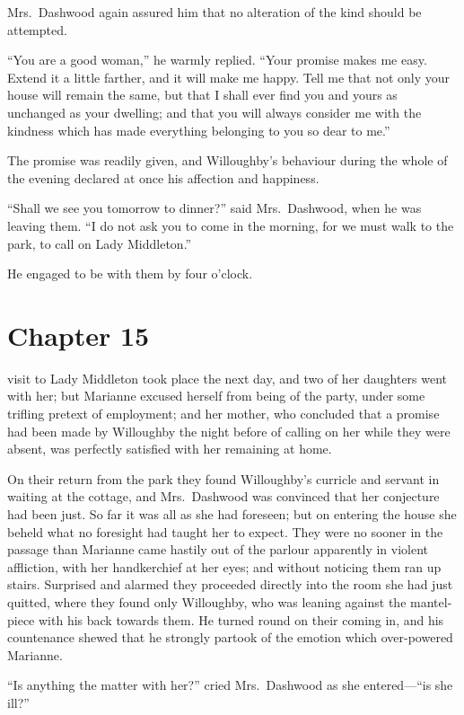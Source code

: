 Mrs.\ Dashwood again assured him that no alteration
of the kind should be attempted.

``You are a good woman,'' he warmly replied.
``Your promise makes me easy.  Extend it a little farther,
and it will make me happy.  Tell me that not only your
house will remain the same, but that I shall ever find
you and yours as unchanged as your dwelling; and that you
will always consider me with the kindness which has made
everything belonging to you so dear to me.''

The promise was readily given, and Willoughby's
behaviour during the whole of the evening declared
at once his affection and happiness.

``Shall we see you tomorrow to dinner?'' said Mrs.\ Dashwood,
when he was leaving them.  ``I do not ask you to come in
the morning, for we must walk to the park, to call on Lady
Middleton.''

He engaged to be with them by four o'clock.



\chapter{Chapter 15}


 visit to Lady Middleton took place
the next day, and two of her daughters went with her;
but Marianne excused herself from being of the party,
under some trifling pretext of employment; and her mother,
who concluded that a promise had been made by Willoughby
the night before of calling on her while they were absent,
was perfectly satisfied with her remaining at home.

On their return from the park they found Willoughby's
curricle and servant in waiting at the cottage,
and Mrs.\ Dashwood was convinced that her conjecture
had been just.  So far it was all as she had foreseen;
but on entering the house she beheld what no foresight
had taught her to expect.  They were no sooner in the
passage than Marianne came hastily out of the parlour
apparently in violent affliction, with her handkerchief
at her eyes; and without noticing them ran up stairs.
Surprised and alarmed they proceeded directly into the room
she had just quitted, where they found only Willoughby,
who was leaning against the mantel-piece with his back
towards them.  He turned round on their coming in,
and his countenance shewed that he strongly partook
of the emotion which over-powered Marianne.

``Is anything the matter with her?'' cried Mrs.\ Dashwood
as she entered---``is she ill?''

